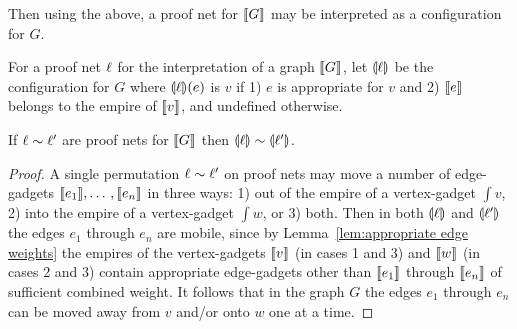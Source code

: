 Then using the above, a proof net for $\llbracket G\rrbracket$ may be interpreted as a configuration for $G$.



\begin{definition}
	For a proof net $\ell$ for the interpretation of a graph $\llbracket G\rrbracket$, let $\llparenthesis\ell\rrparenthesis$ be the configuration for $G$ where $\llparenthesis\ell\rrparenthesis(e)$ is $v$ if 1) $e$ is appropriate for $v$ and 2) $\llbracket e\rrbracket$ belongs to the empire of $\llbracket v\rrbracket$, and undefined otherwise.
\end{definition}





\begin{lemma}
If $\ell\sim\ell'$ are proof nets for $\llbracket G\rrbracket$ then $\llparenthesis\ell\rrparenthesis\sim\llparenthesis\ell'\rrparenthesis$.
\end{lemma}

\begin{proof}
A single permutation $\ell\sim\ell'$ on proof nets may move a number of edge-gadgets $\llbracket e_1\rrbracket,\dotso,\llbracket e_n\rrbracket$ in three ways: 1) out of the empire of a vertex-gadget $\int v$, 2) into the empire of a vertex-gadget $\int w$, or 3) both.
%
Then in both $\llparenthesis\ell\rrparenthesis$ and $\llparenthesis\ell'\rrparenthesis$ the edges $e_1$ through $e_n$ are mobile, since by Lemma~\ref{lem:appropriate edge weights} the empires of the vertex-gadgets $\llbracket v\rrbracket$ (in cases 1 and 3) and $\llbracket w\rrbracket$ (in cases 2 and 3) contain appropriate edge-gadgets other than $\llbracket e_1\rrbracket$ through $\llbracket e_n\rrbracket$ of sufficient combined weight.
%
It follows that in the graph $G$ the edges $e_1$ through $e_n$ can be moved away from $v$ and/or onto $w$ one at a time.

\end{proof}



%
%
%








